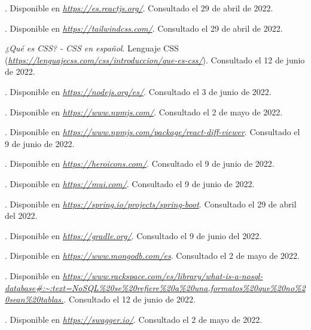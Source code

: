 \begin{thebibliography}{99}
. Disponible en {\it \url{https://es.reactjs.org/}}. Consultado el 29 de abril de 2022.

. Disponible en {\it \url{https://tailwindcss.com/}}. Consultado el 29 de abril de 2022.

 {\it ¿Qué es CSS? - CSS en español}. Lenguaje CSS ({\it \url{https://lenguajecss.com/css/introduccion/que-es-css/}}). Consultado el 12 de junio de 2022.

. Disponible en {\it \url{https://nodejs.org/es/}}. Consultado el 3 de junio de 2022.

. Disponible en {\it \url{https://www.npmjs.com/}}. Consultado el 2 de mayo de 2022.

. Disponible en {\it \url{https://www.npmjs.com/package/react-diff-viewer}}. Consultado el 9 de junio de 2022.

. Disponible en {\it \url{https://heroicons.com/}}. Consultado el 9 de junio de 2022.

. Disponible en {\it \url{https://mui.com/}}. Consultado el 9 de junio de 2022.

. Disponible en {\it \url{https://spring.io/projects/spring-boot}}. Consultado el 29 de abril del 2022.

. Disponible en {\it \url{https://gradle.org/}}. Consultado el 9 de junio del 2022.

. Disponible en {\it \url{https://www.mongodb.com/es}}. Consultado el 2 de mayo de 2022.

. Disponible en {\it \url{https://www.rackspace.com/es/library/what-is-a-nosql-database#:~:text=NoSQL%20se%20refiere%20a%20una,formatos%20que%20no%20sean%20tablas.}}. Consultado el 12 de junio de 2022.

. Disponible en {\it \url{https://swagger.io/}}. Consultado el 2 de mayo de 2022.


\end{thebibliography}
